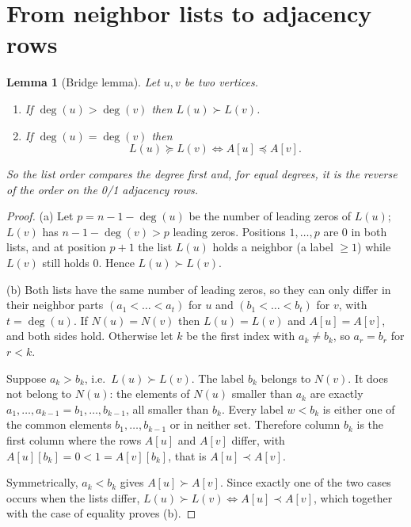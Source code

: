 \documentclass[11pt,a4paper]{article}
\newtheorem{lemma}[theorem]{Lemma}
\theoremstyle{definition}
\theoremstyle{remark}
\newcommand{\lex}{\preceq}
\newcommand{\slex}{\prec}
\newcommand{\nb}{N}
\newcommand{\Lst}{L}
\begin{document}
\section{From neighbor lists to adjacency rows}

\begin{lemma}[Bridge lemma]\label{lem:bridge}
Let $u,v$ be two vertices.
\begin{enumerate}[label=(\alph*)]
  \item If $\deg(u)>\deg(v)$ then $\Lst(u)\succ \Lst(v)$.
  \item If $\deg(u)=\deg(v)$ then
  \[
     \Lst(u)\succeq \Lst(v) \iff A[u]\lex A[v].
  \]
\end{enumerate}
So the list order compares the degree first and, for equal degrees, it is the
\emph{reverse} of the order on the 0/1 adjacency rows.
\end{lemma}

\begin{proof}
(a) Let $p=n-1-\deg(u)$ be the number of leading zeros of $\Lst(u)$; $\Lst(v)$ has
$n-1-\deg(v)>p$ leading zeros. Positions $1,\dots,p$ are $0$ in both lists, and at position
$p+1$ the list $\Lst(u)$ holds a neighbor (a label $\ge 1$) while $\Lst(v)$ still holds $0$.
Hence $\Lst(u)\succ\Lst(v)$.

(b) Both lists have the same number of leading zeros, so they can only differ in their
neighbor parts $(a_1<\dots<a_t)$ for $u$ and $(b_1<\dots<b_t)$ for $v$, with $t=\deg(u)$.
If $\nb(u)=\nb(v)$ then $\Lst(u)=\Lst(v)$ and $A[u]=A[v]$, and both sides hold.
Otherwise let $k$ be the first index with $a_k\ne b_k$, so $a_r=b_r$ for $r<k$.

Suppose $a_k>b_k$, i.e.\ $\Lst(u)\succ\Lst(v)$. The label $b_k$ belongs to $\nb(v)$.
It does not belong to $\nb(u)$: the elements of $\nb(u)$ smaller than $a_k$ are exactly
$a_1,\dots,a_{k-1}=b_1,\dots,b_{k-1}$, all smaller than $b_k$. Every label $w<b_k$ is either
one of the common elements $b_1,\dots,b_{k-1}$ or in neither set. Therefore column $b_k$ is the
first column where the rows $A[u]$ and $A[v]$ differ, with $A[u][b_k]=0<1=A[v][b_k]$, that is
$A[u]\slex A[v]$.

Symmetrically, $a_k<b_k$ gives $A[u]\succ A[v]$. Since exactly one of the two cases occurs
when the lists differ, $\Lst(u)\succ\Lst(v)\iff A[u]\slex A[v]$, which together with the case
of equality proves (b).
\end{proof}
\end{document}
